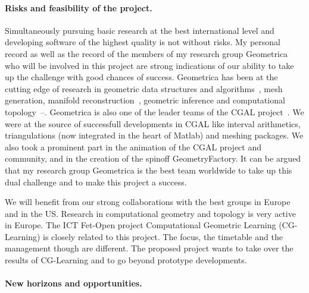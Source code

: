 \paragraph{Risks and feasibility of the project.} 
Simultaneously pursuing basic research at the best international level and developing software of the highest quality is not without risks. %
My personal record as well as the record of the members of my research group Geometrica who will be involved in this project are strong indications of our ability to take up the challenge with good chances of success.  Geometrica has been at the cutting edge of research in geometric data structures and algorithms~\cite{geometrica-ecg-book,by-ag-98}, mesh generation, manifold reconstruction~\cite{geometrica-7142i,geometrica-bgo-09}, geometric inference and computational topology~\cite{geometrica-ccl09}--\cite{geometrica-cseh-07}. Geometrica is also one of the leader teams of the CGAL project~\cite{cgal}.  We were at the source of successfull developments in CGAL like interval arithmetics, triangulations (now integrated in the heart of Matlab) and meshing packages. We also took a prominent part in the animation of the CGAL project and community, and in the creation of the spinoff GeometryFactory. It can be argued that  my research group Geometrica is the best team worldwide to take up this dual challenge and to make this project a success. 


We will benefit from our strong collaborations with the best groups in Europe and in the US.
Research in computational geometry and topology is very active in  Europe.  The ICT Fet-Open project Computational Geometric Learning (CG-Learning) is closely related to this project. The focus, the timetable and the management though are different. The proposed project wants to take over the results of CG-Learning and to go beyond prototype developments.  





\paragraph{New horizons and opportunities.} 



